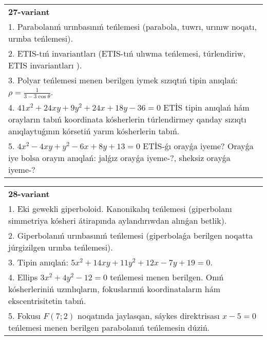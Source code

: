 \documentclass{article}
\begin{document}
\begin{tabular}{m{17cm}}
\textbf{27-variant}\\
1. Parabolanıń urınbasınıń teńlemesi (parabola, tuwrı, urınıw noqatı, urınba teńlemesi).\\

2. ETIS-tıń invariantları (ETIS-tıń ulıwma teńlemesi, túrlendiriw, ETIS invariantları ).\\

3. Polyar teńlemesi menen berilgen iymek sızıqtıń tipin anıqlań: $\rho=\frac{1}{3-3\cos\theta}$.\\

4. $41x^{2} + 24xy + 9y^{2} + 24x + 18y - 36 = 0$ ETİS tipin anıqlań hám orayların tabıń koordinata kósherlerin túrlendirmey qanday sızıqtı anıqlaytuǵının kórsetiń yarım kósherlerin tabıń.  \\

5. $4x^{2} - 4xy + y^{2} - 6x + 8y + 13 = 0$ ETİS-ǵı orayǵa iyeme? Orayǵa iye bolsa orayın anıqlań: jalǵız orayǵa iyeme-?, sheksiz orayǵa iyeme-?  
\end{tabular}
\vspace{1cm}


\begin{tabular}{m{17cm}}
\textbf{28-variant}\\
1. Eki gewekli giperboloid. Kanonikalıq teńlemesi (giperbolanı simmetriya kósheri átirapında aylandırıwdan alınǵan betlik).\\

2. Giperbolanıń urınbasınıń teńlemesi (giperbolaǵa berilgen noqatta júrgizilgen urınba teńlemesi).\\

3. Tipin anıqlań: $5 x^{2}+14 xy+11 y^{2}+12 x-7 y+19=0$.\\

4. Ellips $3x^{2} + 4y^{2} - 12 = 0$ teńlemesi menen berilgen. Onıń kósherleriniń uzınlıqların, fokuslarınıń koordinataların hám ekscentrisitetin tabıń.  \\

5. Fokusı $F(7;2)$ noqatında jaylasqan, sáykes direktrisası $x - 5 = 0$ teńlemesi menen berilgen parabolanıń teńlemesin dúziń.  
\end{tabular}
\vspace{1cm}
\end{document}
